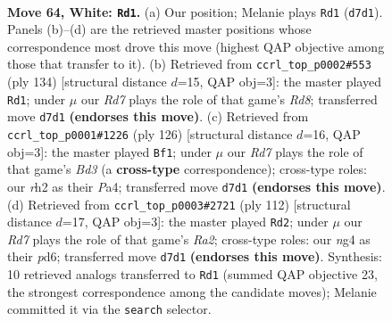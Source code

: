 \documentclass[11pt]{article}
\begin{document}
\clearpage

\begin{figure}[p]\centering
\begin{subfigure}{0.46\textwidth}\centering
\resizebox{\linewidth}{!}{%
\newchessgame
\chessboard[
  setfen={8/3R4/1P5k/8/P5n1/1K6/7r/8 w - - 1 64},
  showmover=false,
  pgfstyle=straightmove, color=movearrow, markmove={d7-d1}
]}
\caption{}
\end{subfigure}\hfill
\begin{subfigure}{0.46\textwidth}\centering
\resizebox{\linewidth}{!}{%
\newchessgame
\chessboard[
  setfen={3R4/8/8/4k3/P1n5/8/7r/1K6 w - - 12 68},
  showmover=false,
  pgfstyle=straightmove, color=movearrow, markmove={d8-d1}
]}
\caption{}
\end{subfigure}
\\[4pt]
\begin{subfigure}{0.46\textwidth}\centering
\resizebox{\linewidth}{!}{%
\newchessgame
\chessboard[
  setfen={8/p1n5/8/3k4/PK6/3B4/5P2/8 w - - 7 64},
  showmover=false,
  pgfstyle=straightmove, color=movearrow, markmove={d3-f1}
]}
\caption{}
\end{subfigure}\hfill
\begin{subfigure}{0.46\textwidth}\centering
\resizebox{\linewidth}{!}{%
\newchessgame
\chessboard[
  setfen={8/1k6/3p4/8/5PK1/1r6/R7/8 w - - 18 57},
  showmover=false,
  pgfstyle=straightmove, color=movearrow, markmove={a2-d2}
]}
\caption{}
\end{subfigure}
\caption{\textbf{Move 64, White: \texttt{Rd1}.} (a) Our position; Melanie plays \texttt{Rd1} (\texttt{d7d1}). Panels (b)--(d) are the retrieved master positions whose correspondence most drove this move (highest QAP objective among those that transfer to it). (b) Retrieved from \texttt{ccrl\_top\_p0002\#553} (ply 134) [structural distance $d$=15, QAP obj=3]: the master played \texttt{Rd1}; under $\mu$ our \emph{Rd7} plays the role of that game's \emph{Rd8}; transferred move \texttt{d7d1} \textbf{(endorses this move)}. (c) Retrieved from \texttt{ccrl\_top\_p0001\#1226} (ply 126) [structural distance $d$=16, QAP obj=3]: the master played \texttt{Bf1}; under $\mu$ our \emph{Rd7} plays the role of that game's \emph{Bd3} (a \textbf{cross-type} correspondence); cross-type roles: our \emph{r}h2 as their \emph{P}a4; transferred move \texttt{d7d1} \textbf{(endorses this move)}. (d) Retrieved from \texttt{ccrl\_top\_p0003\#2721} (ply 112) [structural distance $d$=17, QAP obj=3]: the master played \texttt{Rd2}; under $\mu$ our \emph{Rd7} plays the role of that game's \emph{Ra2}; cross-type roles: our \emph{n}g4 as their \emph{p}d6; transferred move \texttt{d7d1} \textbf{(endorses this move)}. Synthesis: 10 retrieved analogs transferred to \texttt{Rd1} (summed QAP objective 23, the strongest correspondence among the candidate moves); Melanie committed it via the \texttt{search} selector.}
\label{fig:thought-m126}
\end{figure}
\end{document}
